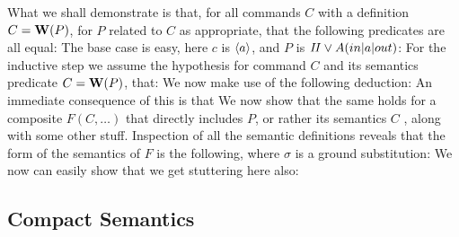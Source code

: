 What we shall demonstrate is that, for all commands $C$
with a definition $C = \mathbf{W}(P)$, for $P$ related to $C$ as appropriate,
that the following predicates are all equal:
The base case is easy, here $c$ is $\langle a\rangle$,
and $P$ is $\mathit{II} \lor A(in|a|out)$:
For the inductive step we assume the hypothesis
for command $C$ and its semantics predicate  $C = \mathbf{W}(P)$,
that:
We now make use of the following deduction:
An immediate consequence of this is that
We now show that the same holds for a composite $F(C,\ldots)$
that directly includes $P$, or rather its semantics $C$
, along with some other stuff.
Inspection of all the semantic definitions reveals
that the form of the semantics of $F$ is the following,
where $\sigma$ is a ground substitution:
We now can easily show that we get stuttering here also:


\subsection{Compact Semantics}

